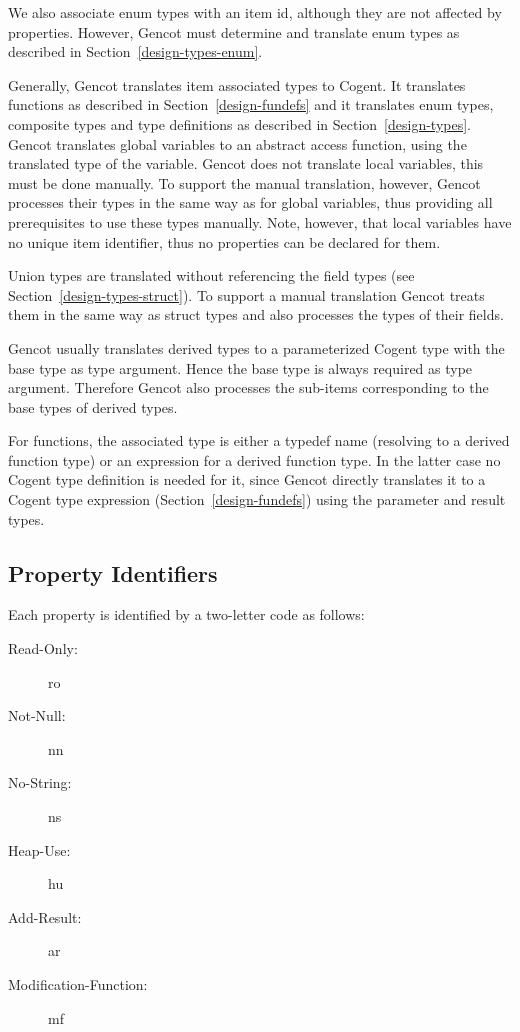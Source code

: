 We also associate enum types with an item id, although they are not affected by properties. However, Gencot must determine 
and translate enum types as described in Section~\ref{design-types-enum}.

Generally, Gencot translates item associated types to Cogent. It translates functions as described in Section~\ref{design-fundefs}
and it translates enum types, composite types and type definitions as described in Section~\ref{design-types}.
Gencot translates global variables to an abstract access function, using the translated type of the variable.
Gencot does not translate local variables, this must be done manually. To support the manual translation, 
however, Gencot processes their types in the same way as for global variables, thus providing all prerequisites
to use these types manually. Note, however, that local variables have no unique item identifier, thus no properties
can be declared for them.

Union types are translated without referencing the field types
(see Section~\ref{design-types-struct}). To support a manual translation Gencot treats them in 
the same way as struct types and also processes the types of their fields.

Gencot usually translates derived types to a parameterized Cogent type with the base type as type argument. Hence the base
type is always required as type argument. Therefore Gencot also processes the sub-items corresponding to the base types 
of derived types.

For functions, the associated type is either a typedef name (resolving to a derived function type) 
or an expression for a derived function type. In the latter case no Cogent type definition is needed for it, since Gencot
directly translates it to a Cogent type expression (Section~\ref{design-fundefs}) using the parameter and result types. 

\subsection{Property Identifiers}
\label{impl-itemprops-property}

Each property is identified by a two-letter code as follows:
\begin{description}
\item[Read-Only:] ro
\item[Not-Null:] nn
\item[No-String:] ns
\item[Heap-Use:] hu
\item[Add-Result:] ar
\item[Modification-Function:] mf
\end{description}

